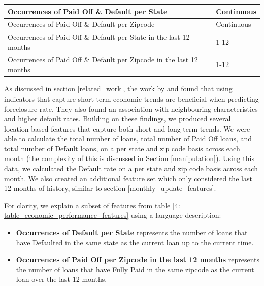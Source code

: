\begin{table}[H]
\begin{tabular}{|p{11.5cm}|p{2.5cm}|}
                    Occurrences of Paid Off \& Default per State & Continuous \\ \hline
                    Occurrences of Paid Off \& Default per Zipcode & Continuous \\ \hline
                    
                    Occurrences of Paid Off \& Default per State in the last 12 months & 1-12  \\ \hline
                    Occurrences of Paid Off \& Default per Zipcode in the last 12 months & 1-12  \\ \hline
                    
                \end{tabular}
                
            \end{table}
            
            
            As discussed in section \ref{related_work}, the work by \cite{default_risk_2011} and \cite{mortgage_risk} found that using indicators that capture short-term economic trends are beneficial when predicting foreclosure rate. They also found an association with neighbouring characteristics and higher default rates. Building on these findings, we produced several location-based features that capture both short and long-term trends. We were able to calculate the total number of loans, total number of Paid Off loans, and total number of Default loans, on a per state and zip code basis across each month (the complexity of this is discussed in Section \ref{manipulation}). Using this data, we calculated the Default rate on a per state and zip code basis across each month. We also created an additional feature set which only considered the last 12 months of history, similar to section \ref{monthly_update_features}.
            
            For clarity, we explain a subset of features from table \ref{4: table_economic_performance_features} using a language description:
            
            \begin{itemize}
              \item \textbf{Occurrences of Default per State} represents the number of loans that have Defaulted in the same state as the current loan up to the current time. 
              \item \textbf{Occurrences of Paid Off per Zipcode in the last 12 months} represents the number of loans that have Fully Paid in the same zipcode as the current loan over the last 12 months.
            \end{itemize}
            
